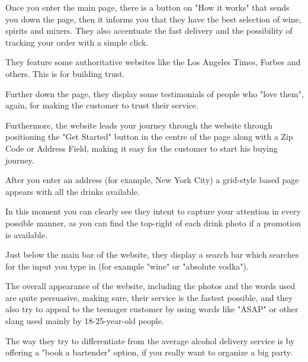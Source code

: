 \documentclass[12p]{article}
\begin{document}
Once you enter the main page, there is a button on "How it works" that sends you down the page, then it informs you that they have the best selection of wine, spirits and mixers. They also accentuate the fast delivery and the possibility of tracking your order with a simple click.

They feature some authoritative websites like the Los Angeles Times, Forbes and others. This is for building trust.

Further down the page, they display some testimonials of people who "love them", again, for making the customer to trust their service.

Furthermore, the website leads your journey through the website through positioning the "Get Started" button in the centre of the page along with a Zip Code or Address Field, making it easy for the customer to start his buying journey.

After you enter an address (for example, New York City) a grid-style based page appears with all the drinks available.

In this moment you can clearly see they intent to capture your attention in every possible manner, as you can find the top-right of each drink photo if a promotion is available.

Just below the main bar of the website, they display a search bar which searches for the input you type in (for example "wine" or "absolute vodka").

The overall appearance of the website, including the photos and the words used are quite persuasive, making sure, their service is the fastest possible, and they also try to appeal to the teenager customer by using words like "ASAP" or other slang used mainly by 18-25-year-old people.

The way they try to differentiate from the average alcohol delivery service is by offering a "book a bartender" option, if you really want to organize a big party.
\end{document}

